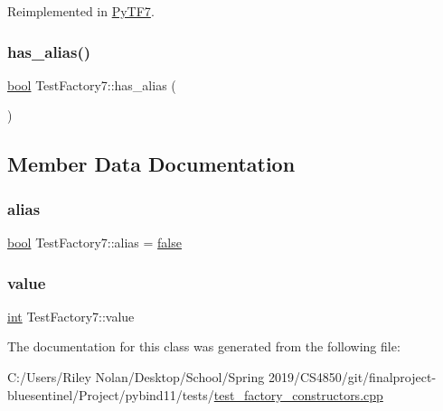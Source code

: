 Reimplemented in \mbox{\hyperlink{class_py_t_f7_a064ae84a4d7c8bf5c8453aa96ad817b9}{Py\+T\+F7}}.

\mbox{\label{class_test_factory7_ab388702c5c8eb5ac9adccd24349119fc}} 
\subsubsection{\texorpdfstring{has\_alias()}{has\_alias()}}
{\footnotesize\ttfamily \mbox{\hyperlink{asdl_8h_af6a258d8f3ee5206d682d799316314b1}{bool}} Test\+Factory7\+::has\+\_\+alias (\begin{DoxyParamCaption}{ }\end{DoxyParamCaption})\hspace{0.3cm}{\ttfamily [inline]}}



\subsection{Member Data Documentation}
\mbox{\label{class_test_factory7_ac4dacf6804fd41a5ae0a600007fb948d}} 
\subsubsection{\texorpdfstring{alias}{alias}}
{\footnotesize\ttfamily \mbox{\hyperlink{asdl_8h_af6a258d8f3ee5206d682d799316314b1}{bool}} Test\+Factory7\+::alias = \mbox{\hyperlink{asdl_8h_af6a258d8f3ee5206d682d799316314b1ae9de385ef6fe9bf3360d1038396b884c}{false}}\hspace{0.3cm}{\ttfamily [protected]}}

\mbox{\label{class_test_factory7_a9e3d39180c5369e2d5747a93e70dad68}} 
\subsubsection{\texorpdfstring{value}{value}}
{\footnotesize\ttfamily \mbox{\hyperlink{warnings_8h_a74f207b5aa4ba51c3a2ad59b219a423b}{int}} Test\+Factory7\+::value\hspace{0.3cm}{\ttfamily [protected]}}



The documentation for this class was generated from the following file\+:\begin{DoxyCompactItemize}
\item 
C\+:/\+Users/\+Riley Nolan/\+Desktop/\+School/\+Spring 2019/\+C\+S4850/git/finalproject-\/bluesentinel/\+Project/pybind11/tests/\mbox{\hyperlink{test__factory__constructors_8cpp}{test\+\_\+factory\+\_\+constructors.\+cpp}}\end{DoxyCompactItemize}
